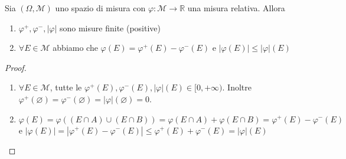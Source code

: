 \begin{theorem}
    Sia \((\Omega, \mathcal{M})\) uno spazio di misura con \(\varphi:
    \mathcal{M} \to \mathbb{R}\) una misura relativa. Allora 
\begin{enumerate}[label = \arabic*)]
    \item \(\varphi^{+}, \varphi^{-}, |\varphi|\) sono misure finite (positive)
    \item \(\forall E \in \mathcal{M}\) abbiamo che 
        \(
            \varphi(E) = \varphi^{+}(E) - \varphi^{-}(E)
        \)
        e 
        \(
            |\varphi(E)| \le |\varphi|(E)
       \)
\end{enumerate}
\end{theorem}
\begin{proof}
\begin{enumerate}[label = \arabic*.]
    \item \(\forall E \in \mathcal{M}\), tutte le \(\varphi^{+}(E), \varphi^{-}(E),
        |\varphi|(E) \in [0, +\infty)\). Inoltre \(\varphi^{+}(\varnothing) =
        \varphi^{-}(\varnothing) = |\varphi|(\varnothing) = 0\).
    \item \(\varphi(E) = \varphi((E \cap A) \cup (E \cap B)) = \varphi(E \cap A)
        + \varphi(E \cap B) = \varphi^{+}(E) - \varphi^{-}(E)\) e \(|\varphi(E)|
        = |\varphi^{+}(E) - \varphi^{-}(E)| \le \varphi^{+}(E) + \varphi^{-}(E)
        = |\varphi|(E)\) 
\end{enumerate}
\end{proof}

